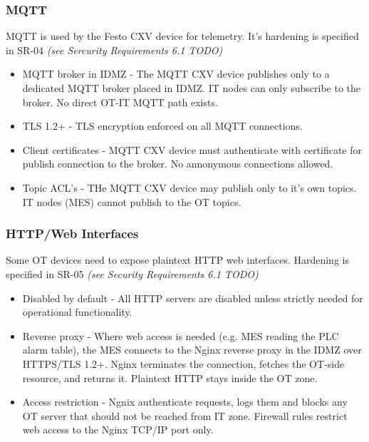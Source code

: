 \subsubsection{MQTT}
MQTT is used by the Festo CXV device for telemetry. It's hardening is specified in SR-04 \textit{(see Sercurity Requirements 6.1 TODO)}
\begin{itemize}
    \item MQTT broker in IDMZ - The MQTT CXV device publishes only to a dedicated MQTT broker placed in IDMZ. IT nodes 
        can only subscribe to the broker. No direct OT-IT MQTT path exists.
    \item TLS 1.2+ - TLS encryption enforced on all MQTT connections.
    \item Client certificates - MQTT CXV device must authenticate with certificate for publish connection to the broker. No annonymous connections allowed.
    \item Topic ACL's - THe MQTT CXV device may publish only to it's own topics. IT nodes (MES) cannot publish to the OT topics.
\end{itemize}

\subsubsection{HTTP/Web Interfaces}
Some OT devices need to expose plaintext HTTP web interfaces. Hardening is specified in SR-05 \textit{(see Security Requirements 6.1 TODO)}

\begin{itemize}
    \item Disabled by default - All HTTP servers are disabled unless strictly needed for operational functionality.
    \item Reverse proxy - Where web access is needed (e.g. MES reading the PLC alarm table), the MES connects to the Nginx reverse proxy in the IDMZ over HTTPS/TLS 1.2+. Nginx terminates the connection, fetches the OT-side resource, and returns it. Plaintext HTTP stays inside the OT zone.
    \item Access restriction - Ngnix authenticate requests, logs them and blocks any OT server that should not be reached from IT zone.
        Firewall rules restrict web access to the Nginx TCP/IP port only.
\end{itemize}

